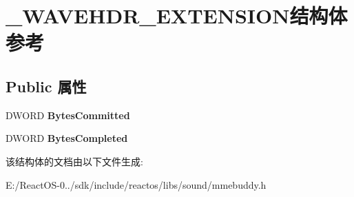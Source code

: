 \hypertarget{struct___w_a_v_e_h_d_r___e_x_t_e_n_s_i_o_n}{}\section{\+\_\+\+W\+A\+V\+E\+H\+D\+R\+\_\+\+E\+X\+T\+E\+N\+S\+I\+O\+N结构体 参考}
\label{struct___w_a_v_e_h_d_r___e_x_t_e_n_s_i_o_n}
\subsection*{Public 属性}
\begin{DoxyCompactItemize}
\item 
\mbox{\label{struct___w_a_v_e_h_d_r___e_x_t_e_n_s_i_o_n_a5624145b6c821052efc983489c093ecb}} 
D\+W\+O\+RD {\bfseries Bytes\+Committed}
\item 
\mbox{\label{struct___w_a_v_e_h_d_r___e_x_t_e_n_s_i_o_n_a8b8bee56f0d4cf3ecb4d17eb126d74c7}} 
D\+W\+O\+RD {\bfseries Bytes\+Completed}
\end{DoxyCompactItemize}


该结构体的文档由以下文件生成\+:\begin{DoxyCompactItemize}
\item 
E\+:/\+React\+O\+S-\/0../sdk/include/reactos/libs/sound/mmebuddy.\+h\end{DoxyCompactItemize}
